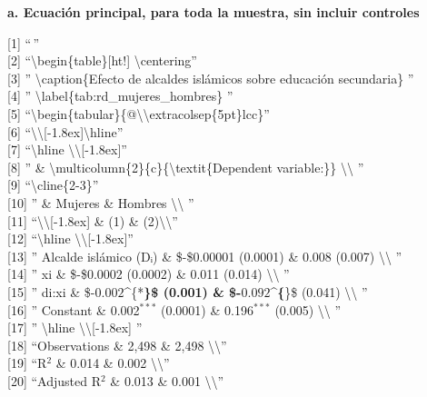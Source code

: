 \documentclass[
]{article}
\begin{document}
\textbf{a. Ecuación principal, para toda la muestra, sin incluir
controles}

{[}1{]} ``\,''\\
{[}2{]} ``\textbackslash begin\{table\}{[}ht!{]}
\textbackslash centering''\\
{[}3{]} '' \textbackslash caption\{Efecto de alcaldes islámicos sobre
educación secundaria\} ''\\
{[}4{]} '' \textbackslash label\{tab:rd\_mujeres\_hombres\} ''\\
{[}5{]}
``\textbackslash begin\{tabular\}\{@\textbackslash\textbackslash extracolsep\{5pt\}lcc\}''\\
{[}6{]}
``\textbackslash\textbackslash{[}-1.8ex{]}\textbackslash hline''\\
{[}7{]} ``\textbackslash hline
\textbackslash\textbackslash{[}-1.8ex{]}''\\
{[}8{]} '' \&
\textbackslash multicolumn\{2\}\{c\}\{\textbackslash textit\{Dependent
variable:\}\} \textbackslash\textbackslash{} ''\\
{[}9{]} ``\textbackslash cline\{2-3\}''\\
{[}10{]} '' \& Mujeres \& Hombres \textbackslash\textbackslash{} ''\\
{[}11{]} ``\textbackslash\textbackslash{[}-1.8ex{]} \& (1) \&
(2)\textbackslash\textbackslash{}''\\
{[}12{]} ``\textbackslash hline
\textbackslash\textbackslash{[}-1.8ex{]}''\\
{[}13{]} '' Alcalde islámico (Dᵢ) \& \$-\$0.00001 (0.0001) \& 0.008
(0.007) \textbackslash\textbackslash{} ''\\
{[}14{]} '' xi \& \$-\$0.0002 (0.0002) \& 0.011 (0.014)
\textbackslash\textbackslash{} ''\\
{[}15{]} '' di:xi \& \$-\(0.002\)\^{}\{*\textbf{\}\$ (0.001) \&
\$-\(0.092\)\^{}\{}\}\$ (0.041) \textbackslash\textbackslash{} ''\\
{[}16{]} '' Constant \& 0.002\(^{***}\) (0.0001) \& 0.196\(^{***}\)
(0.005) \textbackslash\textbackslash{} ''\\
{[}17{]} '' \textbackslash hline
\textbackslash\textbackslash{[}-1.8ex{]} ''\\
{[}18{]} ``Observations \& 2,498 \& 2,498
\textbackslash\textbackslash{}''\\
{[}19{]} ``R\(^{2}\) \& 0.014 \& 0.002
\textbackslash\textbackslash{}''\\
{[}20{]} ``Adjusted R\(^{2}\) \& 0.013 \& 0.001
\textbackslash\textbackslash{}''\\
\end{document}
